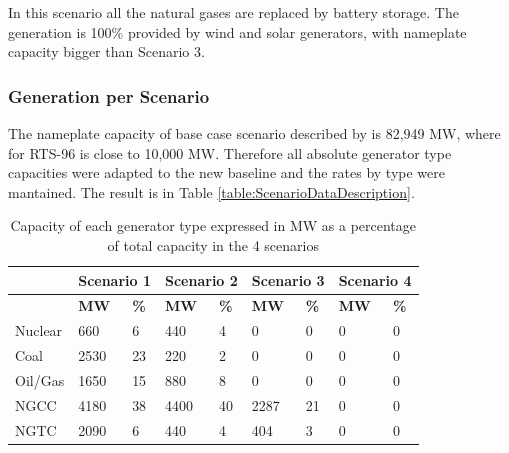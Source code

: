 \documentclass[12pt,LUDisStyle,twosided]{book}
\begin{document}
In this scenario all the natural gases are replaced by battery storage. The generation is 100\% provided by wind and solar generators, with nameplate capacity bigger than Scenario 3.

\subsubsection{Generation per Scenario}

The nameplate capacity of base case scenario described by \citeauthor{shavel} is 82,949 MW, where for RTS-96 is close to 10,000 MW. Therefore all absolute generator type capacities were adapted to the new baseline and the rates by type were mantained. The result is in Table \ref{table:ScenarioDataDescription}.

\begin{table}[h]
\centering
\caption{Capacity of each generator type expressed in MW as a percentage of total capacity in the 4 scenarios}
\label{my-label}
\begin{tabular}{|lllllll|l|l|}
\hline
               & \multicolumn{2}{l}{\textbf{Scenario 1}} & \multicolumn{2}{l}{\textbf{Scenario 2}} & \multicolumn{2}{l|}{\textbf{Scenario 3}} & \multicolumn{2}{l|}{\textbf{Scenario 4}} \\ \hline
               & \textbf{MW}         & \textbf{\%}       & \textbf{MW}         & \textbf{\%}       & \textbf{MW}          & \textbf{\%}       & \textbf{MW}          & \textbf{\%}       \\ \hline
Nuclear        & 660                 & 6                 & 440                 & 4                 & 0                    & 0                 & 0                    & 0                 \\ \hline
Coal           & 2530                & 23                & 220                 & 2                 & 0                    & 0                 & 0                    & 0                 \\ \hline
Oil/Gas        & 1650                & 15                & 880                 & 8                 & 0                    & 0                 & 0                    & 0                 \\ \hline
NGCC           & 4180                & 38                & 4400                & 40                & 2287                 & 21                & 0                    & 0                 \\ \hline
NGTC           & 2090                & 6                 & 440                 & 4                 & 404                  & 3                 & 0                    & 0                 \\ \hline

\end{tabular}
\end{table}
\end{document}
